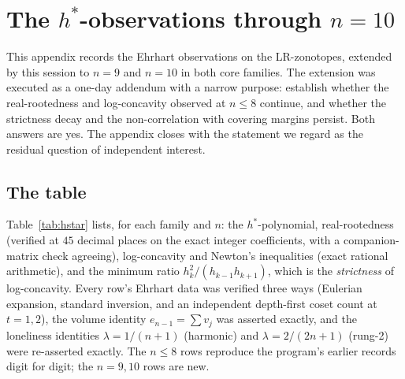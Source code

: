 
\appendix
\section{The \boldmath$h^*$-observations through \boldmath$n=10$}
\label{sec:hstar}

This appendix records the Ehrhart observations on the LR-zonotopes,
extended by this session to $n=9$ and $n=10$ in both core families. The
extension was executed as a one-day addendum with a narrow purpose:
establish whether the real-rootedness and log-concavity observed at
$n\le8$ continue, and whether the strictness decay and the
non-correlation with covering margins persist. Both answers are yes. The
appendix closes with the statement we regard as the residual question of
independent interest.

\subsection{The table}

Table~\ref{tab:hstar} lists, for each family and $n$: the
$h^*$-polynomial, real-rootedness (verified at $45$ decimal places on
the exact integer coefficients, with a companion-matrix check agreeing),
log-concavity and Newton's inequalities (exact rational arithmetic), and
the minimum ratio $h_k^2/(h_{k-1}h_{k+1})$, which is the
\emph{strictness} of log-concavity. Every row's Ehrhart data was
verified three ways (Eulerian expansion, standard inversion, and an
independent depth-first coset count at $t=1,2$), the volume identity
$e_{n-1}=\sum v_j$ was asserted exactly, and the loneliness identities
$\lambda=1/(n{+}1)$ (harmonic) and $\lambda=2/(2n{+}1)$ (rung-2) were
re-asserted exactly. The $n\le8$ rows reproduce the program's earlier
records digit for digit; the $n=9,10$ rows are new.

